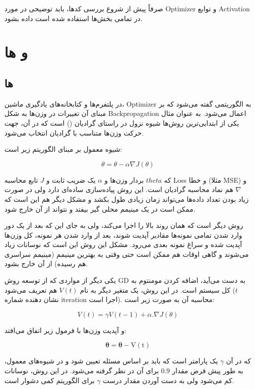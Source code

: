 \documentclass[12pt,titlepage,a4page , tikz , multi,table , svgnames,xcdraw]{article}
\begin{document}
صرفاً پیش از شروع بررسی کدها، باید توضیحی در مورد Optimizer و توابع Activation در تمامی بخش‌ها استفاده شده است داده بشود.

\newpage

\section{ و  ها}

\subsection{ ها}
در پلتفرم‌ها و کتابخانه‌های یادگیری ماشین، Optimizer به الگوریتمی گفته می‌شود که بر مبنای آن تغییرات در وزن‌ها به شکل Backpropagation اعمال می‌شود. به عنوان مثال یکی از ابتدایی‌ترین روش‌ها شیوه نزول در راستای گرادیان () است که در آن، جهت حرکت وزن‌ها متناسب با گرادیان انتخاب می‌شود.

شیوه معمول  بر مبنای الگوریتم زیر است:

$$\theta = \theta - \alpha \nabla J(\theta)$$

که $theta$ بردار وزن‌ها و $\alpha$ یک ضریب ثابت و $J$ تابع محاسبه Loss و خطا (مثلا MSE) و $\nabla$ هم نماد محاسبه گرادیان است. این روش پیاده‌سازی ساده‌ای دارد ولی در صورت زیاد بودن تعداد داده‌ها می‌تواند زمان زیادی طول بکشد و مشکل دیگر هم این است که ممکن است در یک مینیمم محلی گیر بیفتد و نتواند از آن خارج شود.

روش دیگر  است که همان روند بالا را اجرا می‌کند، ولی به جای این که بعد از یک دور وارد شدن تمامی نمونه‌ها مقادیر آپدیت شوند، بعد از وارد شدن هر نمونه، کل وزن‌ها آپدیت شده و سراغ نمونه بعدی می‌رود. مشکل این روش این است که نوسانات زیاد می‌شوند و گاهی اوقات هم ممکن است حتی وقتی به بهترین مینیمم (مینیمم سراسری هم رسیده) از آن خارج بشود.

یکی دیگر از مواردی که از توسعه روش GD به دست می‌آید، اضافه کردن مومنتوم به کل سیستم است. در این روش، یک متغیر دیگر به نام $V(t)$ هم تعریف می‌شود ($t$ نشان دهنده شماره iteration اجرا است). محاسبه آن به صورت زیر است:

$$V(t)=\gamma V(t-1)+\alpha . \nabla J(\theta)$$

و آپدیت وزن‌ها با فرمول زیر اتفاق می‌افتد:

$$\boldsymbol{\theta}=\boldsymbol{\theta}-\mathrm{V}(\mathrm{t})$$

که در آن $\gamma$ یک پارامتر است که باید بر اساس مسئله تعیین شود و در شیوه‌های معمول، به طور پیش فرض مقدار $0.9$ برای آن در نظر گرفته می‌شود. در این روش، نوسانات کم می‌شود ولی به دست آوردن مقدار درست $\gamma$ برای الگوریتم کمی دشوار است.
\end{document}
